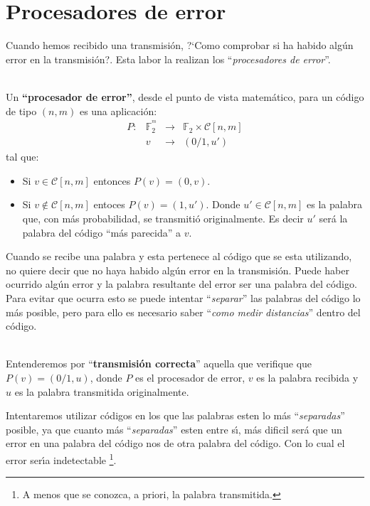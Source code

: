 \section{Procesadores de error}\label{sec:ProcErr}

Cuando hemos recibido una transmisi\'on, ?`Como comprobar si ha habido alg\'un
error en la transmisi\'on?. Esta labor la realizan los ``\emph{procesadores de
error}''.
\begin{definicion}
\ \\
Un \textbf{``procesador de error''}, desde el punto de vista matem\'atico, 
para un c\'odigo de tipo $(n,m)$ es una aplicaci\'on:
\begin{displaymath}
\begin{array}{cccc}
P:&\mathbb{F}^{^m}_2&\longrightarrow & \mathbb{F}_2\times \mathcal{C}[n,m] \\
 & v&\longrightarrow & (0/1,u')
\end{array}
\end{displaymath}
tal que:
\begin{itemize}
\item Si $v \in \mathcal{C}[n,m]$ entonces $P(v)=(0,v)$.
\item Si $v \notin \mathcal{C}[n,m]$ entoces $P(v)=(1,u')$. Donde $u'\in
\mathcal{C}[n,m]$ es la palabra que, con m\'as probabilidad, se transmiti\'o
originalmente. Es decir $u'$ ser\'a la palabra del c\'odigo ``m\'as parecida''
a $v$.
\end{itemize}
\end{definicion}
Cuando se recibe una palabra y esta pertenece al c\'odigo que se esta utilizando, no quiere decir que no haya habido alg\'un error en la transmisi\'on. Puede
haber ocurrido alg\'un error y la palabra resultante del error ser una palabra
del c\'odigo. Para evitar que ocurra esto se puede intentar ``\emph{separar}''
las palabras del c\'odigo lo m\'as posible, pero para ello es necesario saber
``\emph{como medir distancias}'' dentro del c\'odigo.
%
\begin{definicion}
\ \\
Entenderemos por ``\textbf{transmisi\'on correcta}'' aquella que verifique que $P(v)=(0/1,u)$, donde $P$ es el procesador de error, $v$ es la palabra recibida y $u$ es la palabra transmitida originalmente.
\end{definicion}
%
Intentaremos utilizar c\'odigos en los que las palabras esten lo m\'as
``\emph{separadas}'' posible, ya que cuanto m\'as ``\emph{separadas}'' esten
entre s\'{\i}, m\'as dificil ser\'a que un error en una palabra del c\'odigo nos
de otra palabra del c\'odigo. Con lo cual el error ser\'{\i}a indetectable%
\footnote{A menos que se conozca, a priori, la palabra transmitida.}.\\

